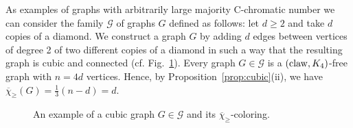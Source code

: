 \documentclass{article}
\theoremstyle{definition}
\newcommand{\mc}{\overline{\chi}_{\geqslant}}
\newcommand{\cg}{{\rm C}_{\geqslant}}
\begin{document}
As examples of  graphs with arbitrarily large majority C-chromatic number we can consider the family $\mathcal{G}$ of graphs $G$ defined as follows: 
    let $d\ge 2$ and  take $d$ copies of a diamond. We construct a graph $G$ by adding $d$ edges between vertices of degree 2 of two different copies of a diamond in such a way that the resulting graph is cubic and connected (cf. Fig.~\ref{fig:three-diamonds}).
 Every graph $G\in \mathcal{G}$ is a $({\rm claw},K_4)$-free graph with $n=4d$ vertices. Hence, by Proposition~\ref{prop:cubic}(ii), we have $\mc(G)=\frac{1}{3}(n-d)=d$.
 
 \begin{figure}[htb]
\centering
{}
\caption{An example of a cubic graph $G\in\mathcal{G}$ and its $\mc$-coloring.}
\label{fig:three-diamonds}
\end{figure}
\end{document}
